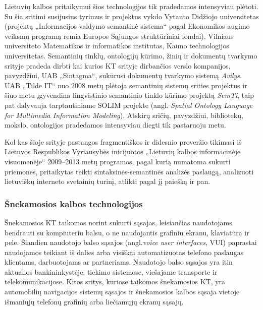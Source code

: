 \begin{multicols}{2}
    Lietuvių kalbos pritaikymui šios technologijos tik pradedamos intensyviau plėtoti. Su šia sritimi susijusius tyrimus ir projektus vykdo Vytauto Didžiojo universitetas (projektą „Informacijos valdymo semantinė sistema“ pagal Ekonomikos augimo veiksmų programą remia Europos Sąjungos struktūriniai fondai), Vilniaus universiteto Matematikos ir informatikos institutas, Kauno technologijos universitetas. Semantinių tinklų, ontologijų kūrimo, žinių ir dokumentų tvarkymo srityje pradeda dirbti kai kurios KT srityje dirbančios verslo kompanijos, pavyzdžiui, UAB „Sintagma“, sukūrusi dokumentų tvarkymo sistemą \textit{Avilys}. UAB „Tilde IT“ nuo 2008 metų plėtoja semantinių sistemų srities projektus ir šiuo metu įgyvendina lingvistinio semantinio tinklo kūrimo projektą \textit{SemTi}, taip pat dalyvauja tarptautiniame SOLIM projekte (angl. \textit{Spatial Ontology Language for Multimedia Information Modeling}). Atskirų sričių, pavyzdžiui, bibliotekų, mokslo, ontologijos pradedamos intensyviau diegti tik pastaruoju metu.   

    Kol kas šioje srityje pastangos fragmentiškos ir didesnio proveržio tikimasi iš Lietuvos Respublikos Vyriausybės inicijuotos „Lietuvių kalbos informacinėje visuomenėje“ 2009–2013 metų programos, pagal kurią numatoma sukurti priemones, pritaikytas teikti sintaksinės-semantinės analizės paslaugą, analizuoti lietuviškų interneto svetainių turinį, atlikti pagal jį paiešką ir pan.
  
\subsubsection{Šnekamosios kalbos technologijos}

Šnekamosios KT taikomos norint sukurti sąsajas, leisiančias naudotojams bendrauti su kompiuteriu balsu, o ne naudojantis grafiniu ekranu, klaviatūra ir pele. Šiandien naudotojo balso sąsajos (angl.\textit{voice user interfaces}, VUI) paprastai naudojamos teikiant iš dalies arba visiškai automatizuotas telefono paslaugas klientams, darbuotojams ar partneriams. Naudotojo balso sąsajos yra itin aktualios bankininkystėje, tiekimo sistemose, viešajame transporte ir telekomunikacijose. Kitos sritys, kuriose taikomos šnekamosios KT, yra automobilių navigacijos sistemų sąsajos ir šnekamosios kalbos sąsaja vietoje išmaniųjų telefonų grafinių arba liečiamųjų ekranų sąsajų.



\end{multicols}
